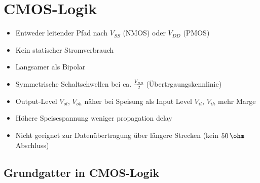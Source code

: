 \section{CMOS-Logik}

\begin{itemize}
    \item Entweder leitender Pfad nach $V_{SS}$ (NMOS) oder $V_{DD}$ (PMOS)
    \item Kein statischer Stromverbrauch
    \item Langsamer als Bipolar
    \item Symmetrische Schaltschwellen bei ca. $\frac{V_{DD}}{2}$ (Übertrgaungskennlinie)
    \item Output-Level $V_{ol}$, $V_{oh}$ näher bei Speisung als Input Level $V_{il}$, $V_{ih}$ \textrightarrow mehr Marge
    \item Höhere Speisespannung \textrightarrow weniger propagation delay
    \item Nicht geeignet zur Datenübertragung über längere Strecken (kein $50 \, \ohm$ Abschluss)
\end{itemize}


\subsection{Grundgatter in CMOS-Logik}

